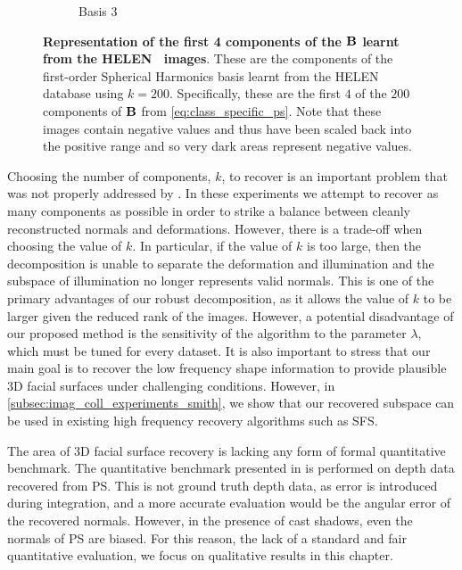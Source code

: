 \begin{figure}[t]
\begin{subfigure}{4cm}
        \caption*{Basis 3}
    \end{subfigure}
    \caption{{\bf Representation of the first 4 components of the $\boldsymbol{\mathbf{B}}$
             learnt from the HELEN~\cite{le2012interactive} images}.
             These are the components of the first-order
             Spherical Harmonics basis learnt from the HELEN database using
             $k = 200$. Specifically, these are the first $4$ of the $200$
             components of $\boldsymbol{\mathbf{B}}$ from \cref{eq:class_specific_ps}. Note that
             these images contain negative values and thus have been scaled
             back into the positive range and so very dark areas represent
             negative values.}
\label{fig:helen-basis}
\end{figure}

Choosing the number of components, $k$, to recover is an
important problem that was not properly addressed by \citet{KemelmacherShlizerman:2013iv}.
In these experiments we attempt to recover as many
components as possible in order to strike a balance between cleanly
reconstructed normals and deformations. However, there is a trade-off when choosing
the value of $k$. In particular, if the value of $k$ is too large, then the
decomposition is unable to separate the deformation and illumination and the subspace of
illumination no longer represents valid normals. This is one of the primary advantages
of our robust decomposition, as it allows the value of $k$ to be larger given
the reduced rank of the images. However, a potential disadvantage of our
proposed method is the sensitivity of the algorithm to the parameter $\lambda$,
which must be tuned for every dataset. It is also important to stress that our
main goal is to recover the low frequency shape information to provide plausible
3D facial surfaces under challenging conditions. However, in
\cref{subsec:imag_coll_experiments_smith}, we show that our recovered subspace can
be used in existing high frequency recovery algorithms such as SFS.\@

The area of 3D facial surface recovery is lacking any form of formal
quantitative benchmark. The quantitative benchmark presented in
\cite{KemelmacherShlizerman:2013iv} is performed on depth data recovered from PS.\@
This is not ground truth depth data, as error is introduced during
integration, and a more accurate evaluation would be the angular error of the
recovered normals. However, in the presence of cast shadows, even the normals of
PS are biased. For this reason, the lack of a standard and fair
quantitative evaluation, we focus on qualitative results in this chapter.

